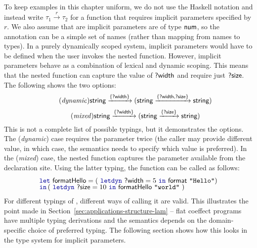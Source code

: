 To keep examples in this chapter uniform, we do not use the Haskell notation and instead
write $\tau_1 \xrightarrow{r} \tau_2$ for a function that requires implicit parameters specified by $r$.
We also assume that are implicit parameters are of type $\textnormal{\sffamily num}$, so the annotation can be a
simple set of names (rather than mapping from names to types). In a purely dynamically scoped system,
implicit parameters would have to be defined when the user invokes the nested function.
However, implicit parameters behave as a combination of lexical and dynamic scoping. This means
that the nested function can capture the value of $\textnormal{\sffamily ?width}$ and require just $\textnormal{\sffamily ?size}$.
The following shows the two options:
%
\begin{equation}
\tag{\emph{dynamic}}
\ident{string} \xrightarrow{ \{ \ident{?width} \} }
  (\ident{string} \xrightarrow{ \{ \ident{?width}, \ident{?size} \} } \ident{string})
\end{equation}
\vspace{-1em}
\begin{equation}
\tag{\emph{mixed}}
\ident{string} \xrightarrow{ \{ \ident{?width} \} }
  (\ident{string} \xrightarrow{ \{ \ident{?size} \} } \ident{string})
\end{equation}
%
This is not a complete list of possible typings, but it demonstrates the options. The (\emph{dynamic})
case requires the parameter  twice (the caller may provide different value, in which
case, the semantics needs to specify which value is preferred). In the (\emph{mixed}) case, the
nested function captures the  parameter available from the declaration site. Using
the latter typing, the function can be called as follows:
%
\begin{equation*}
\begin{array}{l}
 \kvd{let}~\ident{formatHello} = (~\kvd{letdyn}~\ident{?width}=5~\kvd{in}~\ident{format}~\texttt{"Hello"})\\[-0.25em]
 \kvd{in}\,(~\kvd{letdyn}~\ident{?size} = 10~\kvd{in}~\ident{formatHello}~\texttt{"world"}~)
\end{array}
\end{equation*}
%
For different typings of , different ways of calling it are valid. This illustrates
the point made in Section~\ref{sec:applications-structure-lam} -- flat coeffect programs have
multiple typing derivations and the semantics depends on the domain-specific choice of preferred
typing. The following section shows how this looks in the type system for implicit parameters.

